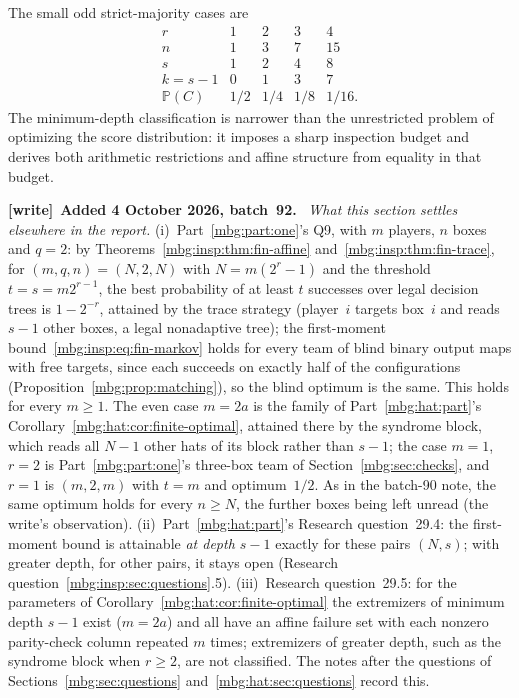 \documentclass[11pt,letterpaper]{article}
\theoremstyle{definition}
\newcommand{\Prb}{\mathbb P}
\newenvironment{writenote}[1][]{\par\smallskip\begingroup\small
 \noindent\textbf{[write]}\if\relax\detokenize{#1}\relax\else~\textbf{#1.}\fi\ }%
 {\par\endgroup\smallskip}
\begin{document}
The small odd strict-majority cases are
\[
\begin{array}{c|rrrr}
 r&1&2&3&4\\\hline
 n&1&3&7&15\\
 s&1&2&4&8\\
 k=s-1&0&1&3&7\\
 \Prb(C)&1/2&1/4&1/8&1/16.
\end{array}
\]
The minimum-depth classification is narrower than the unrestricted
problem of optimizing the score distribution: it imposes a sharp
inspection budget and derives both arithmetic restrictions and affine
structure from equality in that budget.

\begin{writenote}[Added 4 October 2026, batch~92]
\emph{What this section settles elsewhere in the report.} (i)~Part~\ref{mbg:part:one}'s Q9, with $m$ players, $n$ boxes and $q=2$: by Theorems~\ref{mbg:insp:thm:fin-affine} and~\ref{mbg:insp:thm:fin-trace}, for $(m,q,n)=(N,2,N)$ with $N=m(2^r-1)$ and the threshold $t=s=m2^{r-1}$, the best probability of at least $t$ successes over legal decision trees is $1-2^{-r}$, attained by the trace strategy (player~$i$ targets box~$i$ and reads $s-1$ other boxes, a legal nonadaptive tree); the first-moment bound~\eqref{mbg:insp:eq:fin-markov} holds for every team of blind binary output maps with free targets, since each succeeds on exactly half of the configurations (Proposition~\ref{mbg:prop:matching}), so the blind optimum is the same. This holds for every $m\ge1$. The even case $m=2a$ is the family of Part~\ref{mbg:hat:part}'s Corollary~\ref{mbg:hat:cor:finite-optimal}, attained there by the syndrome block, which reads all $N-1$ other hats of its block rather than $s-1$; the case $m=1$, $r=2$ is Part~\ref{mbg:part:one}'s three-box team of Section~\ref{mbg:sec:checks}, and $r=1$ is $(m,2,m)$ with $t=m$ and optimum~$1/2$. As in the batch-90 note, the same optimum holds for every $n\ge N$, the further boxes being left unread (the write's observation). (ii)~Part~\ref{mbg:hat:part}'s Research question~29.4: the first-moment bound is attainable \emph{at depth $s-1$} exactly for these pairs $(N,s)$; with greater depth, for other pairs, it stays open (Research question~\ref{mbg:insp:sec:questions}.5). (iii)~Research question~29.5: for the parameters of Corollary~\ref{mbg:hat:cor:finite-optimal} the extremizers of minimum depth $s-1$ exist ($m=2a$) and all have an affine failure set with each nonzero parity-check column repeated $m$ times; extremizers of greater depth, such as the syndrome block when $r\ge2$, are not classified. The notes after the questions of Sections~\ref{mbg:sec:questions} and~\ref{mbg:hat:sec:questions} record this.
\end{writenote}
\end{document}
